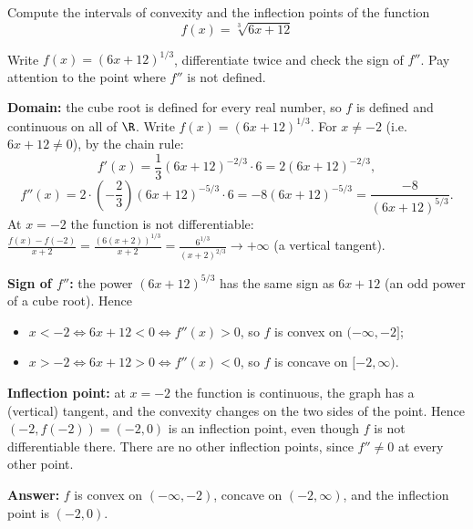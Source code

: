 
\begin{question}
Compute the intervals of convexity and the inflection points of the function
\[ f(x) = \sqrt[3]{6x + 12} \]
\end{question}

\begin{hint}
Write $f(x) = (6x + 12)^{1/3}$, differentiate twice and check the sign of $f''$. Pay attention to the point where $f''$ is not defined.
\end{hint}

\begin{solution}
\textbf{Domain:} the cube root is defined for every real number, so $f$ is defined and continuous on all of $\R$. Write $f(x) = (6x + 12)^{1/3}$. For $x \ne -2$ (i.e. $6x + 12 \ne 0$), by the chain rule:
\[ f'(x) = \frac13 (6x + 12)^{-2/3} \cdot 6 = 2(6x + 12)^{-2/3}, \]
\[ f''(x) = 2\cdot\left(-\frac23\right)(6x + 12)^{-5/3} \cdot 6 = -8(6x + 12)^{-5/3} = \frac{-8}{(6x + 12)^{5/3}}. \]
At $x = -2$ the function is not differentiable: $\frac{f(x) - f(-2)}{x + 2} = \frac{(6(x+2))^{1/3}}{x + 2} = \frac{6^{1/3}}{(x + 2)^{2/3}} \to +\infty$ (a vertical tangent).

\textbf{Sign of $f''$:} the power $(6x + 12)^{5/3}$ has the same sign as $6x + 12$ (an odd power of a cube root). Hence
\begin{itemize}
  \item $x < -2 \iff 6x + 12 < 0 \iff f''(x) > 0$, so $f$ is convex on $(-\infty, -2]$;
  \item $x > -2 \iff 6x + 12 > 0 \iff f''(x) < 0$, so $f$ is concave on $[-2, \infty)$.
\end{itemize}

\textbf{Inflection point:} at $x = -2$ the function is continuous, the graph has a (vertical) tangent, and the convexity changes on the two sides of the point. Hence $(-2, f(-2)) = (-2, 0)$ is an inflection point, even though $f$ is not differentiable there. There are no other inflection points, since $f'' \ne 0$ at every other point.

\textbf{Answer:} $f$ is convex on $(-\infty, -2)$, concave on $(-2, \infty)$, and the inflection point is $(-2, 0)$.
\end{solution}
